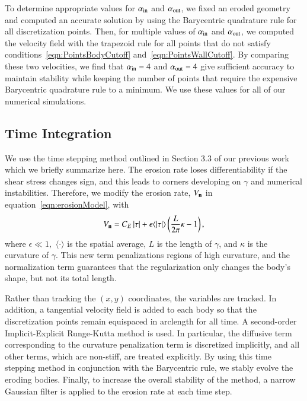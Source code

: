 \documentclass[preprint,10pt]{elsarticle}
\begin{document}
To determine appropriate values for $\alpha_{\mathrm{in}}$ and $\alpha_{\mathrm{out}}$,
we fixed an eroded geometry and computed an accurate solution by using
the Barycentric quadrature rule for all discretization points.  Then,
for multiple values of $\alpha_{\mathrm{in}}$ and $\alpha_{\mathrm{out}}$, we computed the
velocity field with the trapezoid rule for all points that do not
satisfy conditions~\eqref{eqn:PointsBodyCutoff}
and~\eqref{eqn:PointsWallCutoff}.  By comparing these two velocities, we
find that $\alpha_{\mathrm{in}} = 4$ and $\alpha_{\mathrm{out}} = 4$ give sufficient
accuracy to maintain stability while keeping the number of points that
require the expensive Barycentric quadrature rule to a minimum.  We use
these values for all of our numerical simulations.

\subsection{Time Integration}
\label{sec:time}
We use the time stepping method outlined in Section 3.3 of our previous
work~\cite{qua-moo2018} which we briefly summarize here.  The erosion
rate loses differentiability if the shear stress changes sign, and this
leads to corners developing on $\gamma$ and numerical instabilities.
Therefore, we modify the erosion rate, $V_{\mathbf{n}}$ in
equation~\eqref{eqn:erosionModel}, with
\begin{align}
  V_{\mathbf{n}} = C_E \, \lvert \tau \rvert + \epsilon \langle\lvert \tau \rvert\rangle \left(
    \frac{L}{2\pi} \kappa - 1 \right),
\end{align}
where $\epsilon \ll 1,$ $\langle \cdot \rangle$ is the spatial average,
$L$ is the length of $\gamma$, and $\kappa$ is the curvature of
$\gamma$.  This new term penalizations regions of high curvature, and
the normalization term guarantees that the regularization only changes
the body's shape, but not its total length.  

Rather than tracking the $(x,y)$ coordinates, the {\thL} variables are
tracked. In addition, a tangential velocity field is added to each body
so that the discretization points remain equispaced in arclength for all
time.  A second-order Implicit-Explicit Runge-Kutta method is used. In
particular, the diffusive term corresponding to the curvature
penalization term is discretized implicitly, and all other terms, which
are non-stiff, are treated explicitly.  By using this time stepping
method in conjunction with the Barycentric rule, we stably evolve the
eroding bodies.  Finally, to increase the overall stability of the
method, a narrow Gaussian filter is applied to the erosion rate at each
time step.
\end{document}
